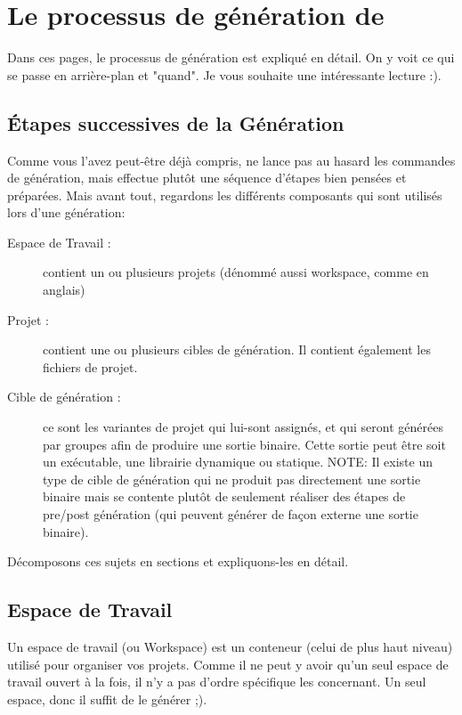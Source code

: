 \section{Le processus de génération de \codeblocks}\label{sec:build_process}

Dans ces pages, le processus de génération est expliqué en détail. On y voit ce qui se passe en arrière-plan et "quand". Je vous souhaite une intéressante lecture :).
 
\subsection{Étapes successives de la Génération}

Comme vous l'avez peut-être déjà compris, \codeblocks ne lance pas au hasard les commandes de génération, mais effectue plutôt une séquence d'étapes bien pensées et préparées. Mais avant tout, regardons les différents composants qui sont utilisés lors d'une génération:

\begin{description}
\item [Espace de Travail :] contient un ou plusieurs projets (dénommé aussi workspace, comme en anglais)
\item [Projet :] contient une ou plusieurs cibles de génération. Il contient également les fichiers de projet.
\item [Cible de génération :] ce sont les variantes de projet qui lui-sont assignés, et qui seront générées par groupes afin de produire une sortie binaire. Cette sortie peut être soit un exécutable, une librairie  dynamique ou statique. NOTE: Il existe un type de cible de génération qui ne produit pas directement une sortie binaire mais se contente plutôt de seulement réaliser des étapes de pre/post génération (qui peuvent générer de façon externe une sortie binaire).
\end{description}

Décomposons ces sujets en sections et expliquons-les en détail.

\subsection{Espace de Travail}

Un espace de travail (ou Workspace) est un conteneur (celui de plus haut niveau) utilisé pour organiser vos projets. Comme il ne peut y avoir qu'un seul espace de travail ouvert à la fois, il n'y a pas d'ordre spécifique les concernant. Un seul espace, donc il suffit de le générer ;).


